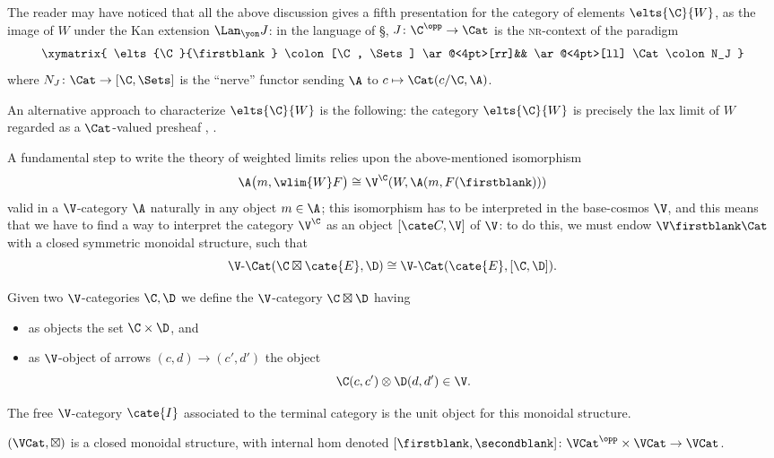 \begin{remark}\label{its.another.nerve}
The reader may have noticed that all the above discussion gives a fifth presentation for the category of elements $\elts{\C}{W}$, as the image of $W$ under the Kan extension $\Lan_\yon J$: in the language of \S{}, $J\colon \C^\opp\to \Cat$ is the \textsc{nr}-context of the paradigm
\[
\xymatrix{
\elts{\C}{\firstblank} \colon [\C, \Sets]  \ar@<4pt>[rr]&& \ar@<4pt>[ll] \Cat\colon N_J
}
\]
where $N_J\colon \Cat \to  [\C, \Sets] $ is the ``nerve'' functor sending $\A$ to $c\mapsto \Cat(c/\C, \A)$.
\end{remark}
\begin{remark}
An alternative approach to characterize $\elts{\C}{W}$ is the following: the category $\elts{\C}{W}$ is precisely the lax limit of $W$ regarded as a $\Cat$-valued presheaf \cite[\S\textbf{4}]{2catlimits}, \cite{Graya,Street19}.
\end{remark}
A fundamental step to write the theory of weighted limits relies upon the above-mentioned isomorphism
\[
\A\big(m,\wlim{W}F\big) \cong \V^{\C}(W, \A(m,F(\firstblank)))
\]
valid in a $\V$-category $\A$ naturally in any object $m\in\A$; this isomorphism has to be interpreted in the base-cosmos $\V$, and this means that we have to find a way to interpret the category $\V^\C$ as an object $[\cate C,{\V}]$ of $\V$: to do this, we must endow $\V\text{\firstblank}\Cat$ with a closed symmetric monoidal structure, such that
\[\label{closurenrich}
\V\text{-}\Cat(\C\boxtimes \cate{E}, \D) \cong 
\V\text{-}\Cat(\cate{E}, [\C,\D]).
\]
\begin{definition}\label{cosmuclosed}
Given two $\V$-categories $\C, \D$ we define the $\V$-category $\C\boxtimes\D$ having
\begin{itemize}
\item as objects the set $\C\times\D$, and 
\item as $\V$-object of arrows $(c,d)\to (c',d')$ the object
\[
\C(c,c')\otimes \D(d,d')\in\V.
\]
\end{itemize}
The free $\V$-category $\cate{I}$ associated to the terminal category is the unit object for this monoidal structure.
\end{definition}
\begin{proposition}
$(\VCat,\boxtimes)$ is a closed monoidal structure, with internal hom denoted $[\firstblank,\secondblank]\colon \VCat^\opp\times \VCat \to \VCat$.
\end{proposition} 
